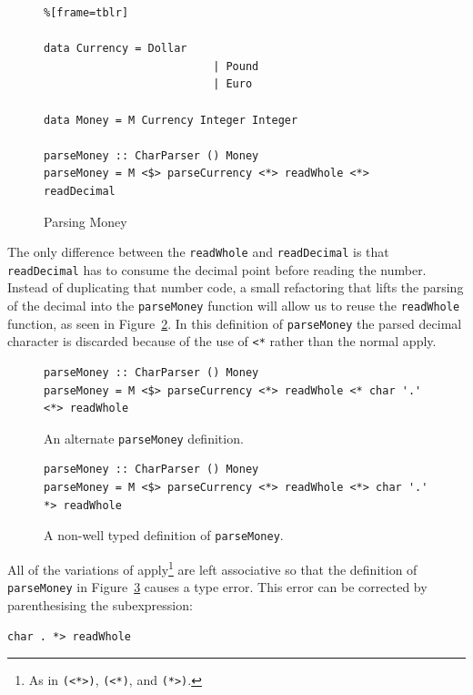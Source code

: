 \begin{figure}[t]
 \begin{lstlisting}%[frame=tblr]

data Currency = Dollar
                          | Pound
                          | Euro
              
data Money = M Currency Integer Integer

parseMoney :: CharParser () Money
parseMoney = M <$> parseCurrency <*> readWhole <*> readDecimal
 \end{lstlisting}
 \caption{Parsing Money}
 \label{parseMoney}
 \end{figure}
 
The only difference between the \texttt{readWhole} and \texttt{readDecimal} is that\\ \texttt{readDecimal} has to consume the decimal point before reading the number. Instead of duplicating that number code, a small refactoring that lifts the parsing of the decimal into the \texttt{parseMoney} function will allow us to reuse the \texttt{readWhole} function, as seen in Figure~\ref{altParseMoney}. In this definition of \texttt{parseMoney} the parsed decimal character is discarded because of the use of \texttt{<*} rather than the normal apply.

\begin{figure}[t]
 \begin{lstlisting}
parseMoney :: CharParser () Money
parseMoney = M <$> parseCurrency <*> readWhole <* char '.' <*> readWhole
 \end{lstlisting}
 \caption{An alternate \texttt{parseMoney} definition.}
 \label{altParseMoney}
\end{figure}

 
 \begin{figure}[t] 
  \begin{lstlisting}
parseMoney :: CharParser () Money
parseMoney = M <$> parseCurrency <*> readWhole <*> char '.' *> readWhole
 \end{lstlisting}
 \caption{A non-well typed definition of \texttt{parseMoney}.}
 \label{typeParseErr}
 \end{figure}
 
All of the variations of apply\footnote{As in \texttt{(<*>)}, \texttt{(<*)}, and \texttt{(*>)}.} are left associative so that the definition of \texttt{parseMoney} in Figure~\ref{typeParseErr} causes a type error. This error can be corrected by parenthesising the subexpression:

\begin{center}
	 \texttt{char \textquotesingle.\textquotesingle~*> readWhole}
\end{center}
 
